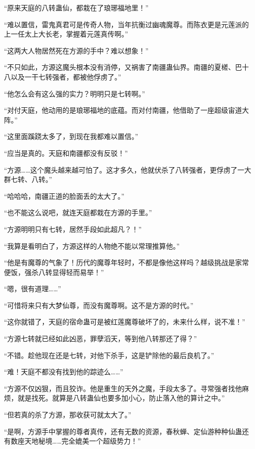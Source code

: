 
\begin{this_body}



“原来天庭的八转蛊仙，都栽在了琅琊福地里！”

“难以置信，雷鬼真君可是传奇人物，当年抗衡过幽魂魔尊。而陈衣更是元莲派的上一任太上大长老，掌握着元莲真传啊。”

“这两大人物居然死在方源的手中？难以想象！”

“不只如此，方源这魔头根本没有消停，又祸害了南疆蛊仙界。南疆的夏槎、巴十八以及一干七转强者，都被他俘虏了。”

“他怎么会有这么强的实力？明明只是七转啊。”

“对付天庭，他动用的是琅琊福地的底蕴。而对付南疆，他借助了一座超级宙道大阵。”

“这里面蹊跷太多了，到现在我都难以置信。”

“应当是真的。天庭和南疆都没有反驳！”

“方源……这个魔头越来越可怕了。这才多久，他就伏杀了八转强者，更俘虏了一大群七转、八转。”

“哈哈哈，南疆正道的脸面丢的太大了。”

“也不能这么说吧，就连天庭都栽在方源的手里。”

“方源明明只有七转，居然手段如此超凡？！”

“我算是看明白了，方源这样的人物绝不能以常理推算他。”

“他是有魔尊的气象了！历代的魔尊年轻时，不都是像他这样吗？越级挑战是家常便饭，强杀八转显得轻而易举！”

“嗯，很有道理……”

“可惜将来只有大梦仙尊，而没有魔尊啊。这不是方源的时代。”

“这你就错了，天庭的宿命蛊可是被红莲魔尊破坏了的，未来什么样，说不准！”

“方源七转就已经如此凶恶，罪孽滔天，等到他八转那还了得？”

“不错。趁他现在还是七转，对他下杀手，这是铲除他的最后良机了。”

“难！天庭不都没有找到他的踪迹么……”

“方源不仅凶狠，而且狡诈。他是重生的天外之魔，手段太多了。寻常强者找他麻烦，就是找死。就算是八转蛊仙也要多加小心，防止落入他的算计之中。”

“但若真的杀了方源，那收获可就太大了。”

“是啊，方源手中掌握的尊者真传，还有无数的资源，春秋蝉、定仙游种种仙蛊还有数座天地秘境……完全媲美一个超级势力！”


\end{this_body}

